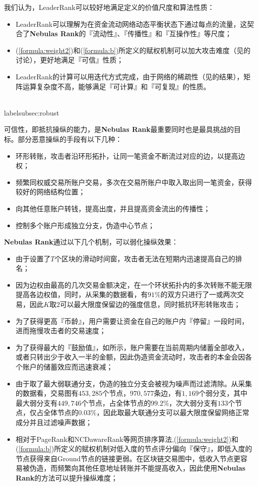 我们认为，LeaderRank可以较好地满足定义的价值尺度和算法性质：
\begin{itemize}
	\item LeaderRank可以理解为在资金流动网络动态平衡状态下通过每点的流量，这契合了\textbf{Nebulas Rank}的『流动性』、『传播性』和『互操作性』等尺度；
	\item (\ref{formula:weight2})和(\ref{formula:b})所定义的赋权机制可以加大攻击难度（见的讨论），更好地满足『可信』性质；
	\item LeaderRank的计算可以用迭代方式完成，由于网络的稀疏性（见的结果），矩阵运算复杂度不高，能够满足『可计算』和『可复现』的性质。
\end{itemize}


\\label{subsec:robust}

可信性，即抵抗操纵的能力，是\textbf{Nebulas Rank}最重要同时也是最具挑战的目标。部分恶意操纵的手段有以下几种：
\begin{itemize}
	\item 环形转账，攻击者沿环形拓扑，让同一笔资金不断流过对应的边，以提高边权；
	\item 频繁同权威交易所账户交易，多次在交易所账户中取入取出同一笔资金，获得较好的网络结构位置；
	\item 向其他任意账户转钱，提高出度，并且提高资金流出的传播性；
	\item 控制多个账户形成独立分支，伪造中心节点；
\end{itemize}

\textbf{Nebulas Rank}通过以下几个机制，可以弱化操纵效果：
\begin{itemize}
	\item 由于设置了$T$个区块的滑动时间窗，攻击者无法在短期内迅速提高自己的排名；
	\item 因为边权由最高的几次交易金额决定，在一个环状拓扑内的多次转账不能无限提高各边权值，同时，从采集的数据看，有$91\%$的双方只进行了一或两次交易，因此$K$取$2$可以最大限度保留边的强度信息，同时抵抗环形转账攻击；
	\item 为了获得更高『币龄』，用户需要让资金在自己的账户内『停留』一段时间，进而拖慢攻击者的交易速度；
	\item 为了获得最大的『鼓励值』，如所示，账户需要在当前周期内储蓄全部收入，或者只转出少于收入一半的金额，因此伪造资金流动时，攻击者的本金会因各个账户的储蓄效应而迅速衰减；
	\item 由于取了最大弱联通分支，伪造的独立分支会被视为噪声而过滤清除。从采集的数据看，交易图有$453,285$个节点，$970,577$条边，有$1,169$个弱分支，其中最大弱分支有$449,746$个节点，占全体节点的$99.2\%$，次大弱分支有$133$个节点，仅占全体节点的$0.03\%$，因此取最大联通分支可以最大限度保留网络正常成分并且过滤噪声数据；
	\item 相对于PageRank和NCDawareRank\cite{Nikolakopoulos2013}等网页排序算法,(\ref{formula:weight2})和(\ref{formula:b})所定义的赋权机制对低入度的节点评分偏向『保守』，即低入度的节点获得来自Ground节点的链接更弱。在区块链交易图中，低收入节点更容易被伪造，而频繁向其他任意地址转账并不能提高收入，因此使用\textbf{Nebulas Rank}的方法可以提升操纵难度；
\end{itemize}

